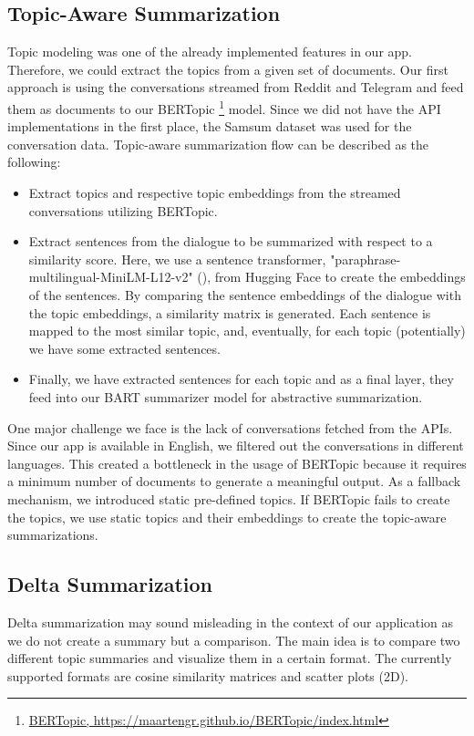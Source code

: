 \subsection{Topic-Aware Summarization}
Topic modeling was one of the already implemented features in our app. Therefore, we could extract the topics from a given set of documents. Our first approach is using the conversations streamed from Reddit and Telegram and feed them as documents to our BERTopic \footnote{\href{https://maartengr.github.io/BERTopic/index.html}{BERTopic, https://maartengr.github.io/BERTopic/index.html}} model. Since we did not have the API implementations in the first place, the Samsum dataset was used for the conversation data. Topic-aware summarization flow can be described as the following:
\begin{itemize}
    \item Extract topics and respective topic embeddings from the streamed conversations utilizing BERTopic.
    \item Extract sentences from the dialogue to be summarized with respect to a similarity score. Here, we use a sentence transformer, "paraphrase-multilingual-MiniLM-L12-v2" (\cite{reimers-2019-sentence-bert}), from Hugging Face to create the embeddings of the sentences. By comparing the sentence embeddings of the dialogue with the topic embeddings, a similarity matrix is generated. Each sentence is mapped to the most similar topic, and, eventually, for each topic (potentially) we have some extracted sentences.
    \item Finally, we have extracted sentences for each topic and as a final layer, they feed into our BART summarizer model for abstractive summarization.
\end{itemize}
One major challenge we face is the lack of conversations fetched from the APIs. Since our app is available in English, we filtered out the conversations in different languages. This created a bottleneck in the usage of BERTopic because it requires a minimum number of documents to generate a meaningful output. As a fallback mechanism, we introduced static pre-defined topics. If BERTopic fails to create the topics, we use static topics and their embeddings to create the topic-aware summarizations.
\subsection{Delta Summarization}
Delta summarization may sound misleading in the context of our application as we do not create a summary but a comparison. The main idea is to compare two different topic summaries and visualize them in a certain format. The currently supported formats are cosine similarity matrices and scatter plots (2D).
